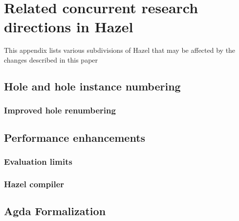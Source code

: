 \section{Related concurrent research directions in Hazel}
\label{app:contributions}

This appendix lists various subdivisions of Hazel that may be affected by the changes described in this paper

\subsection{Hole and hole instance numbering}
\label{sec:concurrent_work_numbering}

\subsubsection{Improved hole renumbering}
\label{sec:other_hole_numbering}


\subsection{Performance enhancements}
\label{sec:concurrent_work_performance}

\subsubsection{Evaluation limits}
\label{sec:gas}


\subsubsection{Hazel compiler}
\label{sec:concurrent_work_compiler}


\subsection{Agda Formalization}
\label{sec:concurrent_work_formalization}


